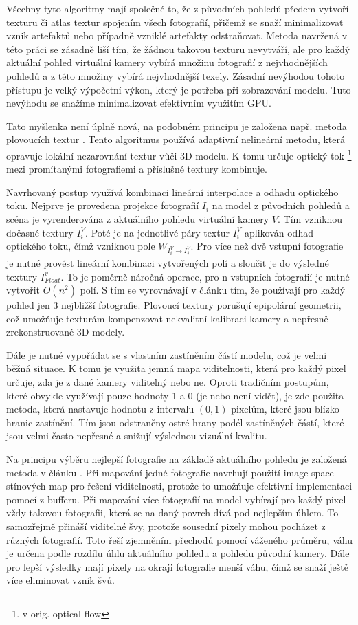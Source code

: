 \documentclass[11pt,twoside,a4paper]{book}
\begin{document}
Všechny tyto algoritmy mají společné to, že z původních pohledů předem vytvoří
texturu či atlas textur spojením všech fotografií, přičemž se snaží
minimalizovat vznik artefaktů nebo případně vzniklé artefakty odstraňovat.
Metoda navržená v této práci se zásadně liší tím, že žádnou takovou texturu
nevytváří, ale pro každý aktuální pohled virtuální kamery vybírá množinu
fotografií z nejvhodnějších pohledů a z této množiny vybírá nejvhodnější texely.
Zásadní nevýhodou tohoto přístupu je velký výpočetní výkon, který je potřeba při
zobrazování modelu. Tuto nevýhodu se snažíme minimalizovat efektivním využitím
GPU.

Tato myšlenka není úplně nová, na podobném principu je založena např. metoda
plovoucích textur \cite{floating-textures}. Tento algoritmus používá adaptivní
nelineární metodu, která opravuje lokální nezarovnání textur vůči 3D modelu. K
tomu určuje optický tok \footnote{v orig. optical flow} mezi promítanými fotografiemi a
příslušné textury kombinuje.

Navrhovaný postup využívá kombinaci lineární interpolace a odhadu optického
toku. Nejprve je provedena projekce fotografií $I_i$ na model z původních
pohledů a scéna je vyrenderována z aktuálního pohledu virtuální kamery $V$. Tím
vzniknou dočasné textury $I_i^V$. Poté je na jednotlivé páry textur $I_i^V$
aplikován odhad optického toku, čímž vzniknou pole $W_{I_i^V \rightarrow
I_j^V}$. Pro více než dvě vstupní fotografie je nutné provést lineární kombinaci
vytvořených polí a sloučit je do výsledné textury $I^v_{Float}$. To je poměrně náročná operace, pro n vstupních fotografií je nutné vytvořit $O(n^2)$ polí. S tím se vyrovnávají v článku tím, že používají pro každý pohled jen 3 nejbližší fotografie. Plovoucí textury porušují epipolární geometrii, což umožňuje texturám kompenzovat nekvalitní kalibraci kamery a nepřesně zrekonstruované 3D modely.

Dále je nutné vypořádat se s vlastním zastíněním částí modelu, což je velmi
běžná situace. K tomu je využita jemná mapa viditelnosti, která pro každý pixel
určuje, zda je z dané kamery viditelný nebo ne. Oproti tradičním postupům, které
obvykle využívají pouze hodnoty 1 a 0 (je nebo není vidět), je zde použita
metoda, která nastavuje hodnotu z intervalu $(0,1)$ pixelům, které jsou blízko
hranic zastínění. Tím jsou odstraněny ostré hrany podél zastíněných částí, které
jsou velmi často nepřesné a snižují výslednou vizuální kvalitu.

Na principu výběru nejlepší fotografie na základě aktuálního pohledu je založená metoda v článku \cite{Debevec96}. Při mapování jedné fotografie navrhují použití image-space stínových map pro řešení viditelnosti, protože to umožňuje efektivní implementaci pomocí z-bufferu. Při mapování více fotografií na model vybírají pro každý pixel vždy takovou fotografii, která se na daný povrch dívá pod nejlepším úhlem. To samozřejmě přináší viditelné švy, protože sousední pixely mohou pocházet z různých fotografií. Toto řeší zjemněním přechodů pomocí váženého průměru, váhu je určena podle rozdílu úhlu aktuálního pohledu a pohledu původní kamery. Dále pro lepší výsledky mají pixely na okraji fotografie menší váhu, čímž se snaží ještě více eliminovat vznik švů.
\end{document}
